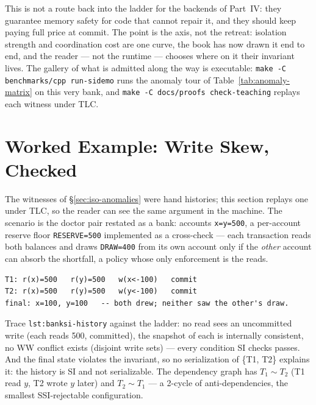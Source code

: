 This is not a route back into the ladder for the backends of Part~IV: they
guarantee memory safety for code that cannot repair it, and they should
keep paying full price at commit. The point is the axis, not the retreat:
isolation strength and coordination cost are one curve, the book has now
drawn it end to end, and the reader --- not the runtime --- chooses where
on it their invariant lives. The gallery of what is admitted along the way
is executable: \texttt{make -C benchmarks/cpp run-sidemo} runs the anomaly
tour of Table~\ref{tab:anomaly-matrix} on this very bank, and
\texttt{make -C docs/proofs check-teaching} replays each witness under
TLC.


\section{Worked Example: Write Skew, Checked}
\label{sec:iso-worked-example}

The witnesses of \S\ref{sec:iso-anomalies} were hand histories; this section
replays one under TLC, so the reader can see the same argument in the
machine. The scenario is the doctor pair restated as a bank: accounts
\texttt{x=y=500}, a per-account reserve floor \texttt{RESERVE=500}
implemented as a cross-check --- each transaction reads both balances and
draws \texttt{DRAW=400} from its own account only if the \emph{other} account
can absorb the shortfall, a policy whose only enforcement is the reads.

\begin{lstlisting}[caption={The write-skew history at SI (both transactions
commit; the outcome admits no serial explanation).},
label={lst:banksi-history}]
T1: r(x)=500   r(y)=500   w(x<-100)   commit
T2: r(x)=500   r(y)=500   w(y<-100)   commit
final: x=100, y=100   -- both drew; neither saw the other's draw.
\end{lstlisting}

Trace \texttt{lst:banksi-history} against the ladder: no read sees an
uncommitted write (each reads 500, committed), the snapshot of each is
internally consistent, no WW conflict exists (disjoint write sets) --- every
condition SI checks passes. And the final state violates the invariant, so
no serialization of \{T1, T2\} explains it: the history is SI and not
serializable. The dependency graph has $T_1 \sim T_2$ (T1 read $y$, T2 wrote
$y$ later) and $T_2 \sim T_1$ --- a 2-cycle of anti-dependencies, the
smallest SSI-rejectable configuration.

